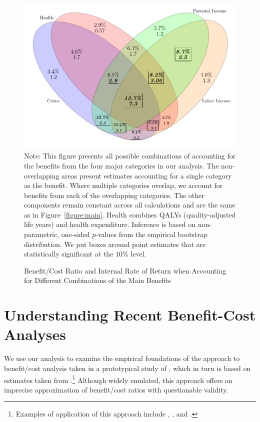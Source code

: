 \begin{figure}[H]
\caption{Benefit/Cost Ratio and Internal Rate of Return when Accounting for Different Combinations of the Main Benefits}\label{figure:vennpooled}
\centering
\includegraphics[width=.7\columnwidth]{output/venn_pooled.pdf}
\footnotesize \justify
Note: This figure presents all possible combinations of accounting for the benefits from the four major categories in our analysis. The non-overlapping areas present estimates accounting for a single category as the benefit. Where multiple categories overlap, we account for benefits from each of the overlapping categories. The other components remain constant across all calculations and are the same as in Figure~\ref{figure:main}. Health combines QALYs (quality-adjusted life years) and health expenditure. Inference is based on non-parametric, one-sided $p$-values from the empirical bootstrap distribution. We put boxes around point estimates that are statistically significant at the $10\%$ level.
\end{figure}

\section{Understanding Recent Benefit-Cost Analyses} \label{section:bcaestimates}

\noindent We use our analysis to examine the empirical foundations of the approach to benefit/cost analysis taken in a prototypical study of \citet{Kline_Walters_2016_QJE}, which in turn is based on estimates taken from \citet{Chetty_Friedman_etal_2011_QJoE}.\footnote{Examples of application of this approach include \citet{Attanasio_Kugler_Meghir_2011_AEJAE}, \cite{Behrman-et-al_2011_JHR-Progresa}, and \cite{Lafortune_etal_2018_Reform_AEJAE}.} Although widely emulated, this approach offers an imprecise approximation of benefit/cost ratios with questionable validity.

